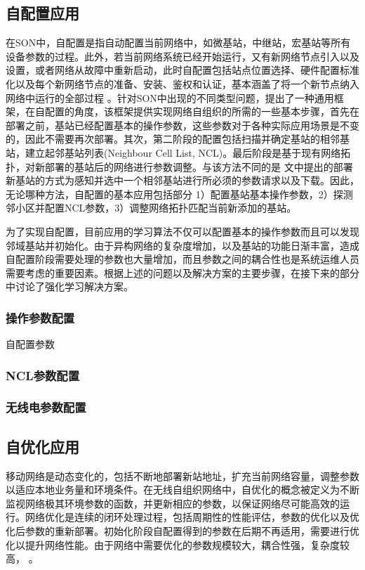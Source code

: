 \documentclass{IEEEtran}
\begin{document}
\subsection{自配置应用}
\label{sec:self-configuration}

在SON中，自配置是指自动配置当前网络中，如微基站，中继站，宏基站等所有设备参数的过程。此外，若当前网络系统已经开始运行，又有新网络节点引入以及设置，或者网络从故障中重新启动，此时自配置包括站点位置选择、硬件配置标准化以及每个新网络节点的准备、安装、鉴权和认证，基本涵盖了将一个新节点纳入网络中运行的全部过程 \cite{Aliu2013}。针对SON中出现的不同类型问题，\cite{Wainio2016}提出了一种通用框架，在自配置的角度，该框架提供实现网络自组织的所需的一些基本步骤，首先在部署之前，基站已经配置基本的操作参数，这些参数对于各种实际应用场景是不变的，因此不需要再次部署。其次，第二阶段的配置包括扫描并确定基站的相邻基站，建立起邻基站列表(Neighbour Cell List, NCL)。最后阶段是基于现有网络拓扑，对新部署的基站后的网络进行参数调整。与该方法不同的是 \cite{Hu2010}文中提出的部署新基站的方式为感知并选中一个相邻基站进行所必须的参数请求以及下载。因此，无论哪种方法，自配置的基本应用包括部分 1）配置基站基本操作参数，2）探测邻小区并配置NCL参数，3）调整网络拓扑匹配当前新添加的基站。

为了实现自配置，目前应用的学习算法不仅可以配置基本的操作参数而且可以发现邻域基站并初始化。由于异构网络的复杂度增加，以及基站的功能日渐丰富，造成自配置阶段需要处理的参数也大量增加，而且参数之间的耦合性也是系统运维人员需要考虑的重要因素。根据上述的问题以及解决方案的主要步骤，在接下来的部分中讨论了强化学习解决方案。

\subsubsection{操作参数配置}

自配置参数

\subsubsection{NCL参数配置}

\subsubsection{无线电参数配置}



\subsection{自优化应用}
\label{sec:self-optimization}
移动网络是动态变化的，包括不断地部署新站地址，扩充当前网络容量，调整参数以适应本地业务量和环境条件。在无线自组织网络中，自优化的概念被定义为不断监视网络极其环境参数的函数，并更新相应的参数，以保证网络尽可能高效的运行\cite{Aliu2013}。网络优化是连续的闭环处理过程，包括周期性的性能评估，参数的优化以及优化后参数的重新部署。初始化阶段自配置得到的参数在后期不再适用，需要进行优化以提升网络性能。由于网络中需要优化的参数规模较大，耦合性强，复杂度较高，  。
\end{document}
